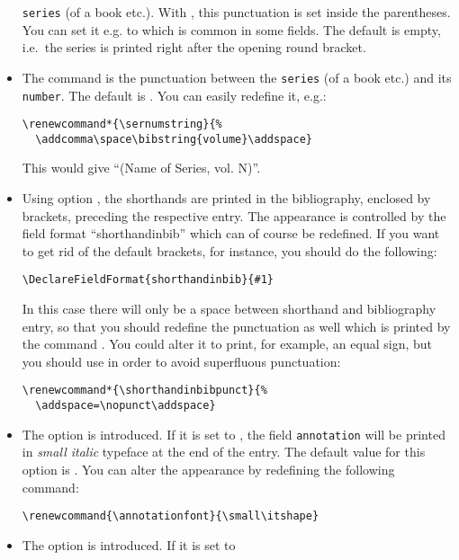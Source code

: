 \documentclass[english]{scrartcl}
\begin{document}
\begin{itemize}
        \texttt{series} (of a book etc.). With , 
        this punctuation is set inside the
        parentheses. You can set it e.g. to  which is
        common in some fields. The default is empty, i.e.\ the series is 
        printed right after the opening round bracket.
  \item The command  is the punctuation between the 
        \texttt{series} (of a book etc.) and its \texttt{number}. The default 
        is . You can easily redefine it, e.g.:
				\begin{lstlisting}
\renewcommand*{\sernumstring}{%
  \addcomma\space\bibstring{volume}\addspace}
				\end{lstlisting}
        This would give \enquote{(Name of Series, vol. N)}.
  \item Using option ,
	      the shorthands are printed in the bibliography, enclosed by brackets, preceding 
				the respective entry. The appearance is controlled by the field format 
				\enquote{shorthandinbib} which can of course be redefined. If you want to get 
				rid of the default brackets, for instance, you should do the following:
				\begin{lstlisting}
\DeclareFieldFormat{shorthandinbib}{#1}
				\end{lstlisting}
				In this case there will only be a space between shorthand and bibliography entry,
				so that you should redefine the punctuation as well which is printed by the
				command . You could alter it to print, for example, an equal 
				sign, but you should use  in order to avoid superfluous punctuation:
				\begin{lstlisting}
\renewcommand*{\shorthandinbibpunct}{%
  \addspace=\nopunct\addspace}
				\end{lstlisting}
  \item The option  is introduced. If it is set to
	      , the field \texttt{annotation} will be printed in 
	      \textit{\small small italic} typeface at the end of the entry. The
	      default value for this option is .
	      You can alter the appearance by redefining the following command:
				\begin{lstlisting}
\renewcommand{\annotationfont}{\small\itshape}
				\end{lstlisting}
	\item The option  is introduced. If it is set to

\end{itemize}
\end{document}
